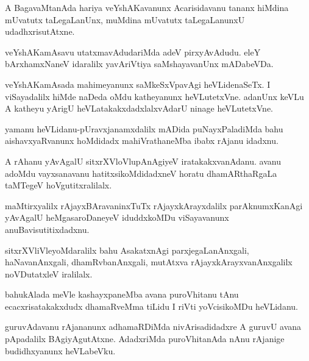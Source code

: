 \documentclass{article}
\begin{document}
\begin{mn}%
A BagavaMtanAda hariya veYshAKavanunx Acarisidavanu tananx hiMdina mUvatutx taLegaLanUnx, 
muMdina mUvatutx taLegaLanunxU udadhxrisutAtxne.
\end{mn}

\begin{mn}%
veYshAKamAsavu utatxmavAdudariMda adeV pirxyAvAdudu. eleY bArxhamxNaneV idaralilx 
yavAriVtiya saMshayavanUnx mADabeVDa.
\end{mn}

\begin{mn}%
veYshAKamAsada mahimeyanunx saMkeSxVpavAgi heVLidenaSeTx. I viSayadalilx hiMde naDeda oMdu 
katheyanunx heVLutetxVne. adanUnx keVLu A katheyu yArigU heVLatakakxdadxlalxvAdarU ninage 
heVLutetxVne.
\end{mn}


\begin{mn}%
yamanu heVLidanu-pUravxjanamxdalilx mADida puNayxPaladiMda bahu aishavxyaRvanunx hoMdidadx 
mahiVrathaneMba ibabx rAjanu idadxnu.
\end{mn}

\begin{mn}%
A rAhanu yAvAgalU sitxrXVloVlupAnAgiyeV iratakakxvanAdanu. avanu adoMdu vayxsanavanu 
hatitxsikoMdidadxneV horatu dhamARthaRgaLa taMTegeV hoVgutitxralilalx.
\end{mn}

\begin{mn}%
maMtirxyalilx rAjayxBAravaninxTuTx rAjayxkArayxdalilx parAknumxKanAgi yAvAgalU 
heMgasaroDaneyeV iduddxkoMDu viSayavanunx anuBavisutitixdadxnu.
\end{mn}

\begin{mn}%
sitxrXVliVleyoMdaralilx bahu AsakatxnAgi parxjegaLanAnxgali, haNavanAnxgali, 
dhamRvbanAnxgali, mutAtxva rAjayxkArayxvanAnxgalilx noVDutatxleV iralilalx.
\end{mn}

\begin{mn}%
bahukAlada meVle kashayxpaneMba avana puroVhitanu tAnu ecacxrisatakakxdudx dhamaRveMma 
tiLidu I riVti yoVcisikoMDu heVLidanu.
\end{mn}

\begin{mn}%
guruvAdavanu rAjananunx adhamaRDiMda nivArisadidadxre A guruvU avana pApadalilx 
BAgiyAgutAtxne. AdadxriMda puroVhitanAda nAnu rAjanige budidhxyanunx heVLabeVku.
\end{mn}
\end{document}
